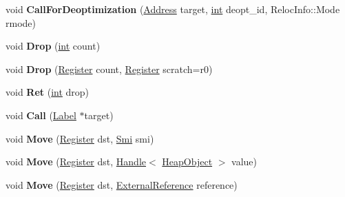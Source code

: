 \begin{DoxyCompactItemize}
void {\bfseries Call\+For\+Deoptimization} (\mbox{\hyperlink{classuintptr__t}{Address}} target, \mbox{\hyperlink{classint}{int}} deopt\+\_\+id, Reloc\+Info\+::\+Mode rmode)
\item 
\mbox{\label{classv8_1_1internal_1_1TurboAssembler_a5b5d206203d10e233f13ba0d31b0c7e2}} 
void {\bfseries Drop} (\mbox{\hyperlink{classint}{int}} count)
\item 
\mbox{\label{classv8_1_1internal_1_1TurboAssembler_aec13b30f60496cc2acde88ba525f446d}} 
void {\bfseries Drop} (\mbox{\hyperlink{classv8_1_1internal_1_1Register}{Register}} count, \mbox{\hyperlink{classv8_1_1internal_1_1Register}{Register}} scratch=r0)
\item 
\mbox{\label{classv8_1_1internal_1_1TurboAssembler_a4f90e9e942eae4da1b6d14894fef318b}} 
void {\bfseries Ret} (\mbox{\hyperlink{classint}{int}} drop)
\item 
\mbox{\label{classv8_1_1internal_1_1TurboAssembler_a76c1a7002369fba1c520446e9e4cfc34}} 
void {\bfseries Call} (\mbox{\hyperlink{classv8_1_1internal_1_1Label}{Label}} $\ast$target)
\item 
\mbox{\label{classv8_1_1internal_1_1TurboAssembler_a508453781521a463ec14cd67cc5c0579}} 
void {\bfseries Move} (\mbox{\hyperlink{classv8_1_1internal_1_1Register}{Register}} dst, \mbox{\hyperlink{classv8_1_1internal_1_1Smi}{Smi}} smi)
\item 
\mbox{\label{classv8_1_1internal_1_1TurboAssembler_ac4d20b0a7501ea25ed334fa37bdaa5ec}} 
void {\bfseries Move} (\mbox{\hyperlink{classv8_1_1internal_1_1Register}{Register}} dst, \mbox{\hyperlink{classv8_1_1internal_1_1Handle}{Handle}}$<$ \mbox{\hyperlink{classv8_1_1internal_1_1HeapObject}{Heap\+Object}} $>$ value)
\item 
\mbox{\label{classv8_1_1internal_1_1TurboAssembler_a227cfc1b14563ed7f3317656ac43f52e}} 
void {\bfseries Move} (\mbox{\hyperlink{classv8_1_1internal_1_1Register}{Register}} dst, \mbox{\hyperlink{classv8_1_1internal_1_1ExternalReference}{External\+Reference}} reference)

\end{DoxyCompactItemize}
